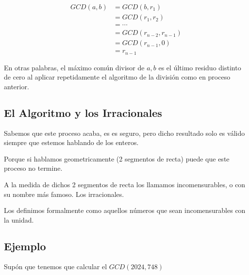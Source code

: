 \documentclass[12pt, fleqn]{report}                             %
\begin{document}
\begin{itemize}
                    \begin{equation*}
                    \begin{split}
                        GCD(a,b)    &= GCD(b,r_1)           \\
                                    &= GCD(r_1,r_2)         \\
                                    &= \cdots               \\
                                    &= GCD(r_{n-2},r_{n-1}) \\
                                    &= GCD(r_{n-1}, 0)      \\
                                    &= r_{n-1} 
                    \end{split}
                    \end{equation*}

            \end{itemize}

            En otras palabras, el máximo común divisor de $a,b$ es el último residuo distinto
            de cero al aplicar repetidamente el algoritmo de la división como en proceso anterior.


        \clearpage
        \subsection{El Algoritmo y los Irracionales}

            Sabemos que este proceso acaba, es es seguro, pero dicho resultado
            solo es válido siempre que estemos hablando de los enteros.

            Porque si hablamos geometricamente (2 segmentos de recta) puede que
            este proceso no termine.

            A la medida de dichos 2 segmentos de recta los llamamos incomensurables, 
            o con su nombre más famoso. Los irracionales.

            Los definimos formalmente como aquellos números que sean incomensurables con
            la unidad.




        \clearpage
        \subsection{Ejemplo}
            Supón que tenemos que calcular el $GCD(2024, 748)$
\end{document}
